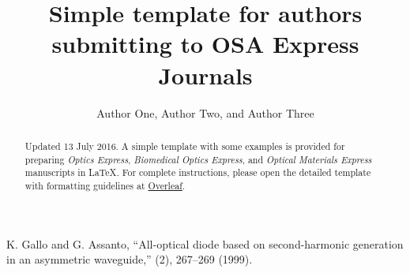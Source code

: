 \documentclass[10pt]{article}
\begin{document}
\title{Simple template for authors submitting to OSA Express Journals}

\author{Author One, Author Two, and Author Three}

\address{Peer Review, Publications Department, The Optical Society, 2010 Massachusetts Avenue NW, Washington, DC 20036, USA\\
Publications Department, The Optical Society, 2010 Massachusetts Avenue NW, Washington, DC 20036, USA\\
Currently with the Department of Electronic Journals, The Optical Society, 2010 Massachusetts Avenue NW, Washington, DC 20036, USA}




\begin{abstract}
Updated 13 July 2016. A simple template with some examples is provided for preparing \textit{Optics Express}, \textit{Biomedical Optics Express}, and \textit{Optical Materials Express} manuscripts in \LaTeX. For complete instructions, please open the detailed template with formatting guidelines at \href{http://www.overleaf.com/docs?template=osa-opex-guide}{Overleaf}.
\end{abstract}


\begin{thebibliography}{99}

 K. Gallo and G. Assanto, ``All-optical diode based on second-harmonic generation in an asymmetric waveguide,'' (2), 267--269 (1999).

\end{thebibliography}

\end{document}
